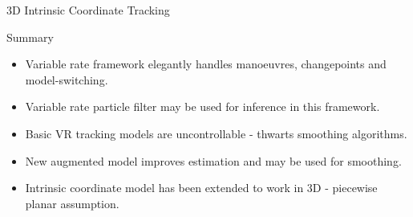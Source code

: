 \documentclass{beamer}
\begin{document}
\begin{frame}{3D Intrinsic Coordinate Tracking}
\begin{figure}
\centering
{} \qquad \qquad
{}
\end{figure}
\end{frame}

\begin{frame}{Summary}
\begin{itemize}
  \item Variable rate framework elegantly handles manoeuvres, changepoints and model-switching.
  \item Variable rate particle filter may be used for inference in this framework.
  \item Basic VR tracking models are uncontrollable - thwarts smoothing algorithms.
  \item New augmented model improves estimation and may be used for smoothing.
  \item Intrinsic coordinate model has been extended to work in 3D - piecewise planar assumption.
\end{itemize}
\end{frame}

\begin{frame}
\end{frame}
\end{document}
